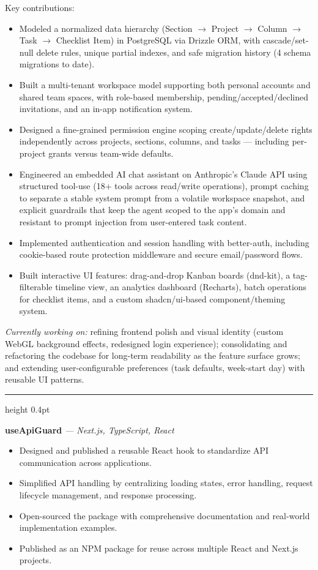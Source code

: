 \documentclass[a4paper,10pt]{article}
\newcommand{\projectdivider}{\vspace{4pt}\textcolor{dividercolor}{\hrule height 0.4pt}\vspace{4pt}}
\newcommand{\projecttitle}[2]{\noindent\textbf{#1} \textit{#2}\par\vspace{1pt}}
\begin{document}
Key contributions:
\begin{itemize}
\item Modeled a normalized data hierarchy (Section $\rightarrow$ Project $\rightarrow$ Column $\rightarrow$ Task $\rightarrow$ Checklist Item) in PostgreSQL via Drizzle ORM, with cascade/set-null delete rules, unique partial indexes, and safe migration history (4 schema migrations to date).
\item Built a multi-tenant workspace model supporting both personal accounts and shared team spaces, with role-based membership, pending/accepted/declined invitations, and an in-app notification system.
\item Designed a fine-grained permission engine scoping create/update/delete rights independently across projects, sections, columns, and tasks --- including per-project grants versus team-wide defaults.
\item Engineered an embedded AI chat assistant on Anthropic's Claude API using structured tool-use (18+ tools across read/write operations), prompt caching to separate a stable system prompt from a volatile workspace snapshot, and explicit guardrails that keep the agent scoped to the app's domain and resistant to prompt injection from user-entered task content.
\item Implemented authentication and session handling with better-auth, including cookie-based route protection middleware and secure email/password flows.
\item Built interactive UI features: drag-and-drop Kanban boards (dnd-kit), a tag-filterable timeline view, an analytics dashboard (Recharts), batch operations for checklist items, and a custom shadcn/ui-based component/theming system.
\end{itemize}

\noindent\textit{Currently working on:} refining frontend polish and visual identity (custom WebGL background effects, redesigned login experience); consolidating and refactoring the codebase for long-term readability as the feature surface grows; and extending user-configurable preferences (task defaults, week-start day) with reusable UI patterns.

\projectdivider

\projecttitle{useApiGuard}{--- Next.js, TypeScript, React}
\begin{itemize}
\item Designed and published a reusable React hook to standardize API communication across applications.
\item Simplified API handling by centralizing loading states, error handling, request lifecycle management, and response processing.
\item Open-sourced the package with comprehensive documentation and real-world implementation examples.
\item Published as an NPM package for reuse across multiple React and Next.js projects.
\end{itemize}
\end{document}

